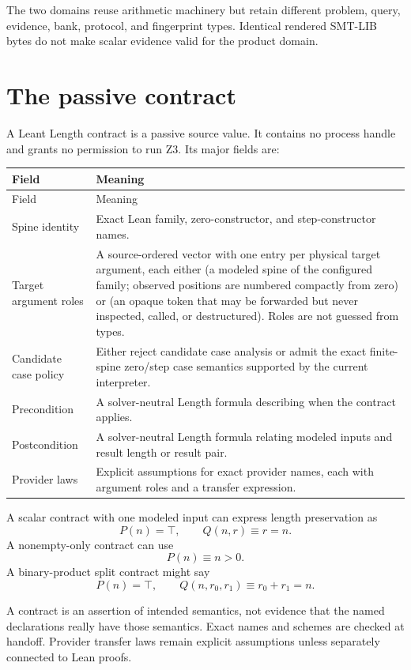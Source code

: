 \documentclass[10pt,letterpaper,oneside]{report}
\newcommand{\code}[1]{\texttt{\detokenize{#1}}}
\begin{document}
The two domains reuse arithmetic machinery but retain different problem, query, evidence, bank, protocol, and fingerprint types. Identical rendered SMT-LIB bytes do not make scalar evidence valid for the product domain.

\section{The passive contract}

A Leant Length contract is a passive source value. It contains no process handle and grants no permission to run Z3. Its major fields are:

\begin{longtable}{@{}L{0.25\textwidth}L{0.69\textwidth}@{}}
\toprule
Field & Meaning \\
\midrule
\endfirsthead
\toprule
Field & Meaning \\
\midrule
\endhead
\bottomrule
\endfoot
Spine identity & Exact Lean family, zero-constructor, and step-constructor names. \\
Target argument roles & A source-ordered vector with one entry per physical target argument, each either \code{observed-spine} (a modeled spine of the configured family; observed positions are numbered compactly from zero) or \code{unobserved-target} (an opaque token that may be forwarded but never inspected, called, or destructured). Roles are not guessed from types. \\
Candidate case policy & Either reject candidate case analysis or admit the exact finite-spine zero/step case semantics supported by the current interpreter. \\
Precondition & A solver-neutral Length formula describing when the contract applies. \\
Postcondition & A solver-neutral Length formula relating modeled inputs and result length or result pair. \\
Provider laws & Explicit assumptions for exact provider names, each with argument roles and a transfer expression. \\
\end{longtable}

A scalar contract with one modeled input can express length preservation as
\[
  P(n)=\top,
  \qquad
  Q(n,r)\equiv r=n.
\]
A nonempty-only contract can use
\[
  P(n)\equiv n>0.
\]
A binary-product split contract might say
\[
  P(n)=\top,
  \qquad
  Q(n,r_0,r_1)\equiv r_0+r_1=n.
\]

\begin{trustbox}
A contract is an assertion of intended semantics, not evidence that the named declarations really have those semantics. Exact names and schemes are checked at handoff. Provider transfer laws remain explicit assumptions unless separately connected to Lean proofs.
\end{trustbox}
\end{document}
